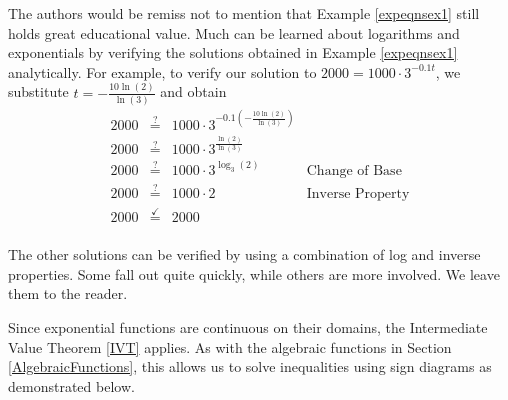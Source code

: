 \medskip

The authors would be remiss not to mention that Example \ref{expeqnsex1} still holds great educational value.  Much can be learned about logarithms and exponentials by verifying the solutions obtained in Example \ref{expeqnsex1} analytically. For example, to verify our solution to  $2000 = 1000 \cdot 3^{-0.1 t}$, we substitute $t = -\frac{10\ln(2)}{\ln(3)}$ and obtain 
\[ \begin{array}{rclr}

2000 & \stackrel{?}{=} & 1000 \cdot 3^{-0.1 \left(-\frac{10\ln(2)}{\ln(3)}\right)} & \\
2000 & \stackrel{?}{=} & 1000 \cdot 3^{\frac{\ln(2)}{\ln(3)}} & \\
2000 & \stackrel{?}{=} & 1000 \cdot 3^{\log_{3}(2)} & \mbox{Change of Base}\\
2000 & \stackrel{?}{=} & 1000 \cdot 2 & \mbox{Inverse Property}\\
2000 & \stackrel{\checkmark}{=} & 2000 & \\

\end{array}\]

The other solutions can be verified by using a combination of log and inverse properties.  Some fall out quite quickly, while others are more involved.  We leave them to the reader.

\smallskip

Since exponential functions are continuous on their domains, the Intermediate Value Theorem \ref{IVT} applies.  As with the algebraic functions in Section \ref{AlgebraicFunctions}, this allows us to solve inequalities using sign diagrams as demonstrated below.

\pagebreak

